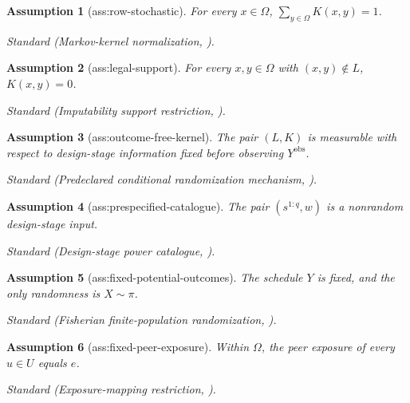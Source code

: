 \documentclass{article}
\newtheorem{assumption}{Assumption}
\begin{document}
\begin{assumption}[ass:row-stochastic]\label{ass:row-stochastic}
For every \(x\in\Omega\), \(\sum_{y\in\Omega}K(x,y)=1\).
\par\smallskip\noindent\emph{Standard} (Markov-kernel normalization, \cite{RamdasBarberCandesTibshirani2023Arbitrary}).
\end{assumption}

\begin{assumption}[ass:legal-support]\label{ass:legal-support}
For every \(x,y\in\Omega\) with \((x,y)\notin L\), \(K(x,y)=0\).
\par\smallskip\noindent\emph{Standard} (Imputability support restriction, \cite{PuelzBasseFellerToulis2022Graph}).
\end{assumption}

\begin{assumption}[ass:outcome-free-kernel]\label{ass:outcome-free-kernel}
The pair \((L,K)\) is measurable with respect to design-stage information fixed before observing \(Y^{\mathrm{obs}}\).
\par\smallskip\noindent\emph{Standard} (Predeclared conditional randomization mechanism, \cite{ZhangZhao2023Randomization}).
\end{assumption}

\begin{assumption}[ass:prespecified-catalogue]\label{ass:prespecified-catalogue}
The pair \((s^{1:q},w)\) is a nonrandom design-stage input.
\par\smallskip\noindent\emph{Standard} (Design-stage power catalogue, \cite{YanagiSei2022Improving}).
\end{assumption}

\begin{assumption}[ass:fixed-potential-outcomes]\label{ass:fixed-potential-outcomes}
The schedule \(Y\) is fixed, and the only randomness is \(X\sim\pi\).
\par\smallskip\noindent\emph{Standard} (Fisherian finite-population randomization, \cite{CaugheyDafoeLiMiratrix2023Bounded}).
\end{assumption}

\begin{assumption}[ass:fixed-peer-exposure]\label{ass:fixed-peer-exposure}
Within \(\Omega\), the peer exposure of every \(u\in U\) equals \(e\).
\par\smallskip\noindent\emph{Standard} (Exposure-mapping restriction, \cite{AronowSamii2017GeneralInterference}).
\end{assumption}
\end{document}

